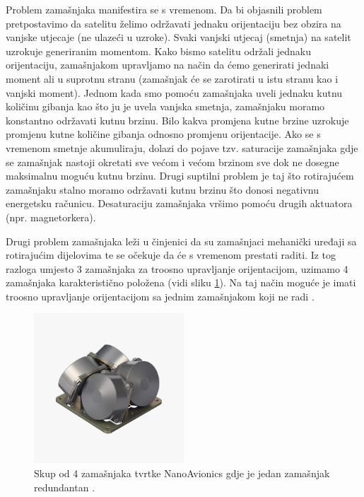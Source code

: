 \documentclass[times, utf8, diplomski, numeric]{templates/template}
\begin{document}
{{{{                Problem zamašnjaka manifestira se s vremenom. Da bi objasnili problem pretpostavimo da satelitu želimo održavati jednaku orijentaciju bez obzira na vanjske utjecaje (ne ulazeći u uzroke). Svaki vanjski utjecaj (smetnja) na satelit uzrokuje generiranim momentom. Kako bismo satelitu održali jednaku orijentaciju, zamašnjakom upravljamo na način da ćemo generirati jednaki moment ali u suprotnu stranu (zamašnjak će se zarotirati u istu stranu kao i vanjski moment). Jednom kada smo pomoću zamašnjaka uveli jednaku kutnu količinu gibanja kao što ju je uvela vanjska smetnja, zamašnjaku moramo konstantno održavati kutnu brzinu. Bilo kakva promjena kutne brzine uzrokuje promjenu kutne količine gibanja odnosno promjenu orijentacije. Ako se s vremenom smetnje akumuliraju, dolazi do pojave tzv. saturacije zamašnjaka gdje se zamašnjak nastoji okretati sve većom i većom brzinom sve dok ne dosegne maksimalnu moguću kutnu brzinu. Drugi suptilni problem je taj što rotirajućem zamašnjaku stalno moramo održavati kutnu brzinu što donosi negativnu energetsku računicu. Desaturaciju zamašnjaka vršimo pomoću drugih aktuatora (npr. magnetorkera).

                Drugi problem zamašnjaka leži u činjenici da su zamašnjaci mehanički uređaji sa rotirajućim dijelovima te se očekuje da će s vremenom prestati raditi. Iz tog razloga umjesto 3 zamašnjaka za troosno upravljanje orijentacijom, uzimamo 4 zamašnjaka karakteristično položena (vidi sliku \ref{fig:cetiri_zamasnjaka}). Na taj način moguće je imati troosno upravljanje orijentacijom sa jednim zamašnjakom koji ne radi \cite{cetiriZamasnjaka}.

                \begin{figure}[htb]
                \centering
                \includegraphics[width=0.5\textwidth]{images/cetiri_zamasnjaka.jpg}
                \caption{Skup od 4 zamašnjaka tvrtke NanoAvionics gdje je jedan zamašnjak redundantan \cite{cetiriZamasnjakaTvrtka}.}
                \label{fig:cetiri_zamasnjaka}
                \end{figure}
            }
        }
    }

}
\end{document}
